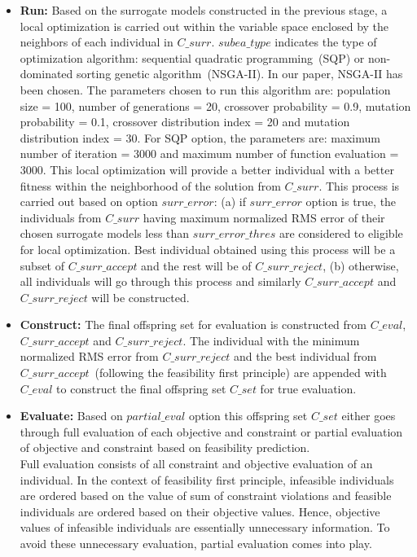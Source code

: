 \begin{itemize}
	\item \textbf{Run:} Based on the surrogate models constructed in the previous stage, a local optimization is carried out within the variable space enclosed by the neighbors of each individual in $C\_surr$. $subea\_type$ indicates the type of optimization algorithm: sequential quadratic programming~(SQP) or non-dominated sorting genetic algorithm~(NSGA-II). In our paper, NSGA-II has been chosen. The parameters chosen to run this algorithm are: population size = 100, number of generations = 20, crossover probability = 0.9, mutation probability = 0.1, crossover distribution index = 20 and mutation distribution index = 30. For SQP option, the parameters are: maximum number of iteration = 3000 and maximum number of function evaluation = 3000. This local optimization will provide a better individual with a better fitness within the neighborhood of the solution from $C\_surr$. This process is carried out based on option $surr\_error$: (a) if $surr\_error$ option is true, the individuals from $C\_surr$ having maximum normalized RMS error of their chosen surrogate models less than $surr\_error\_thres$ are considered to eligible for local optimization. Best individual obtained using this process will be a subset of $C\_surr\_accept$ and the rest will be of $C\_surr\_reject$, (b) otherwise, all individuals will go through this process and similarly $C\_surr\_accept$ and $C\_surr\_reject$ will be constructed. 
	
	\item \textbf{Construct:} The final offspring set for evaluation is constructed from $C\_eval$, $C\_surr\_accept$ and $C\_surr\_reject$. The individual with the minimum normalized RMS error from $C\_surr\_reject$ and the best individual from $C\_surr\_accept$~(following the feasibility first principle) are appended with $C\_eval$ to construct the final offspring set $C\_set$ for true evaluation.
	
	\item \textbf{Evaluate:} Based on $partial\_eval$ option this offspring set $C\_set$ either goes through full evaluation of each objective and constraint or partial evaluation of objective and constraint based on feasibility prediction. \\ 
	Full evaluation consists of all constraint and objective evaluation of an individual. In the context of feasibility first principle, infeasible individuals are ordered based on the value of sum of constraint violations and feasible individuals are ordered based on their objective values. Hence, objective values of infeasible individuals are essentially unnecessary information. To avoid these unnecessary evaluation, partial evaluation comes into play.\\
	
\end{itemize}







